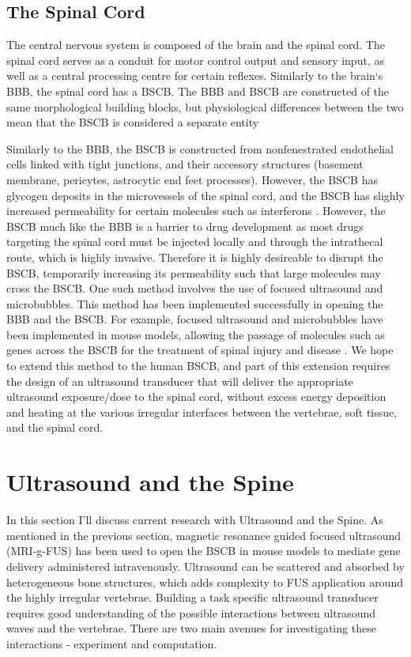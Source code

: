 \documentclass[11pt,titlepage]{article} %
\begin{document}
\subsection{The Spinal Cord}
The central nervous system is composed of the brain and the spinal cord. The spinal cord serves as a conduit for motor control output and sensory input, as well as a central processing centre for certain reflexes. Similarly to the brain`s BBB, the spinal cord has a BSCB. The BBB and BSCB are constructed of the same morphological building blocks, but physiological differences between the two mean that the BSCB is considered a separate entity \cite{bartanusz2011blood}

Similarly to the BBB, the BSCB is constructed from nonfenestrated endothelial cells linked with tight junctions, and their accessory structures (basement membrane, pericytes, astrocytic end feet processes). However, the BSCB has glycogen deposits in the microvessels of the spinal cord, and the BSCB has slighly increased permeability for certain molecules such as interferons \cite{sharma2005pathophysiology,pan1997permeability}. However, the BSCB much like the BBB is a barrier to drug development as most drugs targeting the spinal cord must be injected locally and through the intrathecal route, which is highly invasive. Therefore it is highly desireable to disrupt the BSCB, temporarily increasing its permeability such that large molecules may cross the BSCB. One such method involves the use of focused ultrasound and microbubbles. This method has been implemented successfully in opening the BBB and the BSCB. For example, focused ultrasound and microbubbles have been implemented in mouse models, allowing the passage of molecules such as genes across the BSCB for the treatment of spinal injury and disease \cite{weber2015gene}. We hope to extend this method to the human BSCB, and part of this extension requires the design of an ultrasound transducer that will deliver the appropriate ultrasound exposure/dose to the spinal cord, without excess energy deposition and heating at the various irregular interfaces between the vertebrae, soft tissue, and the spinal cord. 


\section{Ultrasound and the Spine}

In this section I'll discuss current research with Ultrasound and the Spine. As mentioned in the previous section, magnetic resonance guided focused ultrasound (MRI-g-FUS) has been used to open the BSCB in mouse models to mediate gene delivery administered intravenously\cite{weber2015gene}. Ultrasound can be scattered and absorbed by heterogeneous bone structures, which adds complexity to FUS application around the highly irregular vertebrae. Building a task specific ultrasound transducer requires good understanding of the possible interactions between ultrasound waves and the vertebrae. There are two main avenues for investigating these interactions - experiment and computation. 
\end{document}
